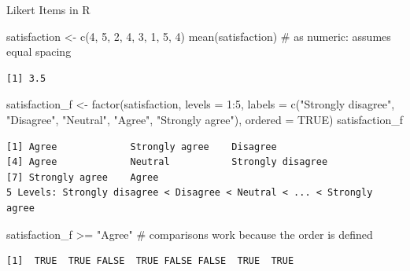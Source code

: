\documentclass[
  ignorenonframetext,
  aspectratio=169,
]{beamer}
\newenvironment{Shaded}{\begin{snugshade}}{\end{snugshade}}
\newcommand{\AttributeTok}[1]{\textcolor[rgb]{0.40,0.45,0.13}{#1}}
\newcommand{\CommentTok}[1]{\textcolor[rgb]{0.37,0.37,0.37}{#1}}
\newcommand{\ConstantTok}[1]{\textcolor[rgb]{0.56,0.35,0.01}{#1}}
\newcommand{\DecValTok}[1]{\textcolor[rgb]{0.68,0.00,0.00}{#1}}
\newcommand{\FunctionTok}[1]{\textcolor[rgb]{0.28,0.35,0.67}{#1}}
\newcommand{\NormalTok}[1]{\textcolor[rgb]{0.00,0.23,0.31}{#1}}
\newcommand{\OtherTok}[1]{\textcolor[rgb]{0.00,0.23,0.31}{#1}}
\newcommand{\SpecialCharTok}[1]{\textcolor[rgb]{0.37,0.37,0.37}{#1}}
\newcommand{\StringTok}[1]{\textcolor[rgb]{0.13,0.47,0.30}{#1}}
\begin{document}
\begin{frame}[fragile]{Likert Items in R}
\protect\hypertarget{likert-items-in-r}{}
\begin{Shaded}
\begin{Highlighting}[]
\NormalTok{satisfaction }\OtherTok{\textless{}{-}} \FunctionTok{c}\NormalTok{(}\DecValTok{4}\NormalTok{, }\DecValTok{5}\NormalTok{, }\DecValTok{2}\NormalTok{, }\DecValTok{4}\NormalTok{, }\DecValTok{3}\NormalTok{, }\DecValTok{1}\NormalTok{, }\DecValTok{5}\NormalTok{, }\DecValTok{4}\NormalTok{)}
\FunctionTok{mean}\NormalTok{(satisfaction)          }\CommentTok{\# as numeric: assumes equal spacing}
\end{Highlighting}
\end{Shaded}

\begin{verbatim}
[1] 3.5
\end{verbatim}

\begin{Shaded}
\begin{Highlighting}[]
\NormalTok{satisfaction\_f }\OtherTok{\textless{}{-}} \FunctionTok{factor}\NormalTok{(satisfaction, }\AttributeTok{levels =} \DecValTok{1}\SpecialCharTok{:}\DecValTok{5}\NormalTok{,}
                         \AttributeTok{labels =} \FunctionTok{c}\NormalTok{(}\StringTok{"Strongly disagree"}\NormalTok{, }\StringTok{"Disagree"}\NormalTok{, }\StringTok{"Neutral"}\NormalTok{,}
                                    \StringTok{"Agree"}\NormalTok{, }\StringTok{"Strongly agree"}\NormalTok{),}
                         \AttributeTok{ordered =} \ConstantTok{TRUE}\NormalTok{)}
\NormalTok{satisfaction\_f}
\end{Highlighting}
\end{Shaded}

\begin{verbatim}
[1] Agree             Strongly agree    Disagree         
[4] Agree             Neutral           Strongly disagree
[7] Strongly agree    Agree            
5 Levels: Strongly disagree < Disagree < Neutral < ... < Strongly agree
\end{verbatim}

\begin{Shaded}
\begin{Highlighting}[]
\NormalTok{satisfaction\_f }\SpecialCharTok{\textgreater{}=} \StringTok{"Agree"}   \CommentTok{\# comparisons work because the order is defined}
\end{Highlighting}
\end{Shaded}

\begin{verbatim}
[1]  TRUE  TRUE FALSE  TRUE FALSE FALSE  TRUE  TRUE
\end{verbatim}
\end{frame}
\end{document}
